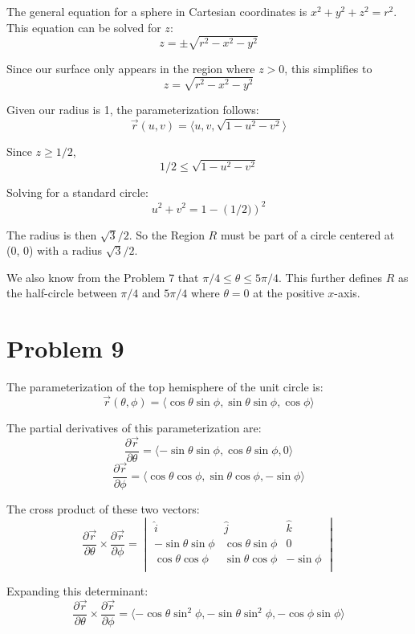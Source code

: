 \documentclass{article}
\begin{document}
The general equation for a sphere in Cartesian coordinates is $x^2 + y^2 + z^2 =
r^2$. This equation can be solved for $z$:
$$ z = \pm \sqrt{r^2 - x^2 - y^2} $$

Since our surface only appears in the region where $z > 0$, this simplifies to 
$$ z = \sqrt{r^2 - x^2 - y^2} $$

Given our radius is 1, the parameterization follows:
$$ \vec{r}(u, v) = \langle u, v, \sqrt{1 - u^2 - v^2} \rangle $$

Since $z \geq 1/2$, 
$$ 1 / 2 \leq \sqrt{1 - u^2 - v^2} $$

Solving for a standard circle:
$$u^2 + v^2 = 1 - \left(1/2)\right)^2 $$

The radius is then $\sqrt{3} / 2$. So the Region $R$ must be part of a circle
centered at (0, 0) with a radius $\sqrt{3} / 2$.

\bigbreak

We also know from the Problem 7 that $\pi / 4 \leq \theta \leq  5 \pi / 4$. This
further defines $R$ as the half-circle between $\pi / 4$ and $5 \pi / 4$ where
$\theta = 0$ at the positive $x$-axis.

\section*{Problem 9}

The parameterization of the top hemisphere of the unit circle is:
$$ \vec{r}(\theta, \phi) = \langle \cos \theta \sin \phi, \sin \theta \sin \phi,
\cos \phi \rangle $$

The partial derivatives of this parameterization are:
$$ \frac{\partial \vec{r}}{\partial \theta} = \langle -\sin \theta \sin \phi,
\cos \theta \sin \phi, 0 \rangle $$
$$ \frac{\partial \vec{r}}{\partial \phi} = \langle \cos \theta \cos \phi, \sin
\theta \cos \phi, -\sin \phi \rangle $$

The cross product of these two vectors:
$$ \frac{\partial \vec{r}}{\partial \theta} \times \frac{\partial
\vec{r}}{\partial \phi} =
\begin{vmatrix}
  \hat{i} & \hat{j} & \hat{k} \\
  -\sin \theta \sin \phi & \cos \theta \sin \phi & 0 \\
  \cos \theta \cos \phi & \sin \theta \cos \phi & - \sin \phi \\
\end{vmatrix} $$

Expanding this determinant:
$$ \frac{\partial \vec{r}}{\partial \theta} \times \frac{\partial
\vec{r}}{\partial \phi} = \langle -\cos \theta \sin^2 \phi, -\sin \theta \sin^2
\phi, -\cos \phi \sin \phi \rangle $$
\end{document}
